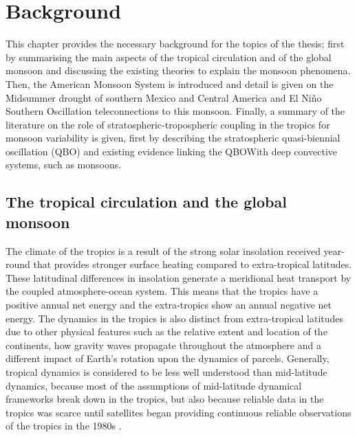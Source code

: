 

\chapter{\label{ch:2-litreview}Background}


 This chapter provides the necessary background for the topics of the thesis; first by summarising the main aspects of the tropical circulation and of the global monsoon and discussing the existing theories to explain the monsoon phenomena. Then, the American Monsoon System is introduced and detail is given on the Midsummer drought of southern Mexico and Central America and El Niño Southern Oscillation teleconnections to this monsoon. Finally, a summary of the literature on the role of stratospheric-tropospheric coupling in the tropics for monsoon variability is given, first by describing the stratospheric quasi-biennial oscillation (QBO) and existing evidence linking the QBOWith deep convective systems, such as monsoons. %
\section{The tropical circulation and the global monsoon}\label{sq:bk_tropics}

The climate of the tropics is a result of the strong solar insolation received year-round that provides stronger surface heating compared to extra-tropical latitudes. These latitudinal differences in insolation generate a meridional heat transport by the coupled atmosphere-ocean system. This means that the tropics have a positive annual net energy and the extra-tropics show an annual negative net energy. 
The dynamics in the tropics is also distinct from extra-tropical latitudes due to other physical features such as the relative extent and location of the continents, how gravity waves propagate throughout the atmosphere and a different impact of Earth's rotation upon the dynamics of parcels. 
Generally, tropical dynamics is considered to be less well understood than mid-latitude dynamics, because most of the assumptions of mid-latitude dynamical frameworks break down in the tropics, but also because reliable data in the tropics was scarce until satellites began providing continuous reliable observations of the tropics in the 1980s \citep{emanuel2007quasi,webster2020dynamics}.


